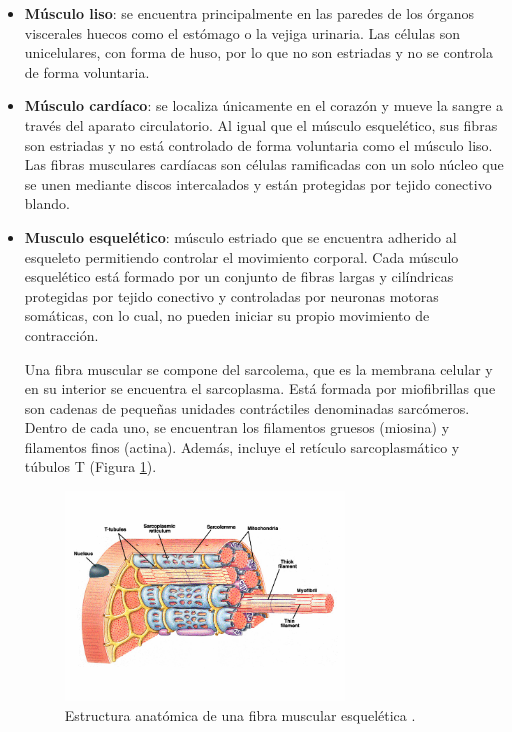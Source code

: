 \begin{itemize}
    \item \textbf{Músculo liso}: se encuentra principalmente en las paredes de los órganos viscerales huecos como el estómago o la vejiga urinaria. Las células son unicelulares, con forma de huso, por lo que no son estriadas y no se controla de forma voluntaria.
    \item \textbf{Músculo cardíaco}: se localiza únicamente en el corazón y mueve la sangre a través del aparato circulatorio. Al igual que el músculo esquelético, sus fibras son estriadas y no está controlado de forma voluntaria como el músculo liso. Las fibras musculares cardíacas son células ramificadas con un solo núcleo que se unen mediante discos intercalados y están protegidas por tejido conectivo blando. 
    \item \textbf{Musculo esquelético}: músculo estriado que se encuentra adherido al esqueleto permitiendo controlar el movimiento corporal. Cada músculo esquelético está formado por un conjunto de fibras largas y cilíndricas protegidas por tejido conectivo y controladas por neuronas motoras somáticas, con lo cual, no pueden iniciar su propio movimiento de contracción.

    Una fibra muscular se compone  del sarcolema, que es la membrana celular y en su interior se encuentra el sarcoplasma. Está formada por miofibrillas que son cadenas de pequeñas unidades contráctiles denominadas sarcómeros. Dentro de cada uno, se encuentran los filamentos gruesos (miosina) y filamentos finos (actina). Además, incluye el retículo sarcoplasmático y túbulos T (Figura \ref{fig:fibra-muscular}).

    \begin{figure}[ht]
    \centering
    \includegraphics[width=0.7\textwidth]{img/fibra-muscular.png}
    \caption{Estructura anatómica de una fibra muscular esquelética \cite{website:docplayer}.}
    \label{fig:fibra-muscular}
    \end{figure}

\end{itemize}


